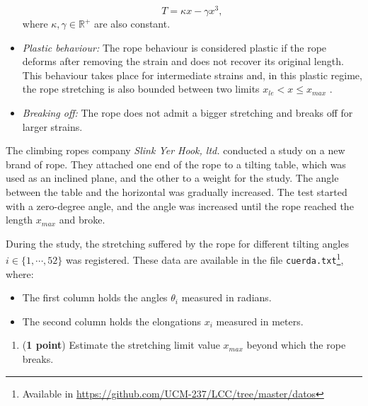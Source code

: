 \begin{paracol}{2}
\begin{itemize}
	\begin{equation}\label{eq:1}
		T = \kappa x - \gamma x^3,
	\end{equation}
	where $\kappa, \gamma \in \mathbb{R}^+$ are also constant.
	
	\item \emph{Plastic behaviour:} The rope behaviour is considered plastic if the rope deforms after removing the strain and does not recover its original length. This behaviour takes place for intermediate strains and, in this plastic regime, the rope stretching is also bounded between two limits $x_{le} < x \le x_{max}$ .
	
	\item \emph{Breaking off:} The rope does not admit a bigger stretching and breaks off for larger strains.
\end{itemize}

 The climbing ropes company \emph{Slink Yer Hook, ltd.} conducted a study on a new brand of rope. They attached one end of the rope to a tilting table, which was used as an inclined plane, and the other to a weight for the study. The angle between the table and the horizontal was gradually increased. The test started with a zero-degree angle, and the angle was increased until the rope reached the length $x_{max}$ and broke.
 
During the study, the stretching suffered by the rope for different tilting angles $i \in \{1,\cdots,52\}$ was registered. These data are available in the file \texttt{cuerda.txt}\footnote{Available in \url{https://github.com/UCM-237/LCC/tree/master/datos}}, where:

\begin{itemize}
	\item The first column holds the angles $\theta_i$ measured in radians.
	\item The second column holds the elongations $x_i$ measured in meters.
\end{itemize}

\begin{enumerate}
	\item (\textbf{1 point}) Estimate the stretching limit value $x_{max}$ beyond which the rope breaks.
	

\end{enumerate}
\end{paracol}
